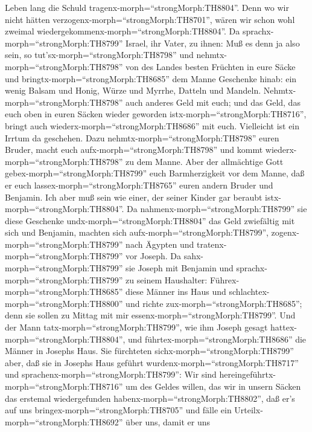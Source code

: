 Leben lang die Schuld tragenx-morph=``strongMorph:TH8804''.
 Denn wo wir nicht hätten
verzogenx-morph=``strongMorph:TH8701'', wären wir schon wohl zweimal
wiedergekommenx-morph=``strongMorph:TH8804''.  Da
sprachx-morph=``strongMorph:TH8799'' Israel, ihr Vater, zu ihnen: Muß es
denn ja also sein, so tut'sx-morph=``strongMorph:TH8798'' und
nehmtx-morph=``strongMorph:TH8798'' von des Landes besten Früchten in
eure Säcke und bringtx-morph=``strongMorph:TH8685'' dem Manne Geschenke
hinab: ein wenig Balsam und Honig, Würze und Myrrhe, Datteln und
Mandeln.  Nehmtx-morph=``strongMorph:TH8798'' auch anderes
Geld mit euch; und das Geld, das euch oben in euren Säcken wieder
geworden istx-morph=``strongMorph:TH8716'', bringt auch
wiederx-morph=``strongMorph:TH8686'' mit euch. Vielleicht ist ein Irrtum
da geschehen.  Dazu nehmtx-morph=``strongMorph:TH8798''
euren Bruder, macht euch aufx-morph=``strongMorph:TH8798'' und kommt
wiederx-morph=``strongMorph:TH8798'' zu dem Manne.  Aber
der allmächtige Gott gebex-morph=``strongMorph:TH8799'' euch
Barmherzigkeit vor dem Manne, daß er euch
lassex-morph=``strongMorph:TH8765'' euren andern Bruder und Benjamin.
Ich aber muß sein wie einer, der seiner Kinder gar beraubt
istx-morph=``strongMorph:TH8804''.  Da
nahmenx-morph=``strongMorph:TH8799'' sie diese Geschenke
undx-morph=``strongMorph:TH8804'' das Geld zwiefältig mit sich und
Benjamin, machten sich aufx-morph=``strongMorph:TH8799'',
zogenx-morph=``strongMorph:TH8799'' nach Ägypten und
tratenx-morph=``strongMorph:TH8799'' vor Joseph.  Da
sahx-morph=``strongMorph:TH8799'' sie Joseph mit Benjamin und
sprachx-morph=``strongMorph:TH8799'' zu seinem Haushalter:
Führex-morph=``strongMorph:TH8685'' diese Männer ins Haus und
schlachtex-morph=``strongMorph:TH8800'' und richte
zux-morph=``strongMorph:TH8685''; denn sie sollen zu Mittag mit mir
essenx-morph=``strongMorph:TH8799''.  Und der Mann
tatx-morph=``strongMorph:TH8799'', wie ihm Joseph gesagt
hattex-morph=``strongMorph:TH8804'', und
führtex-morph=``strongMorph:TH8686'' die Männer in Josephs Haus.
 Sie fürchteten sichx-morph=``strongMorph:TH8799'' aber,
daß sie in Josephs Haus geführt wurdenx-morph=``strongMorph:TH8717'' und
sprachenx-morph=``strongMorph:TH8799'': Wir sind
hereingeführtx-morph=``strongMorph:TH8716'' um des Geldes willen, das
wir in unsern Säcken das erstemal wiedergefunden
habenx-morph=``strongMorph:TH8802'', daß er's auf uns
bringex-morph=``strongMorph:TH8705'' und fälle ein
Urteilx-morph=``strongMorph:TH8692'' über uns, damit er uns
